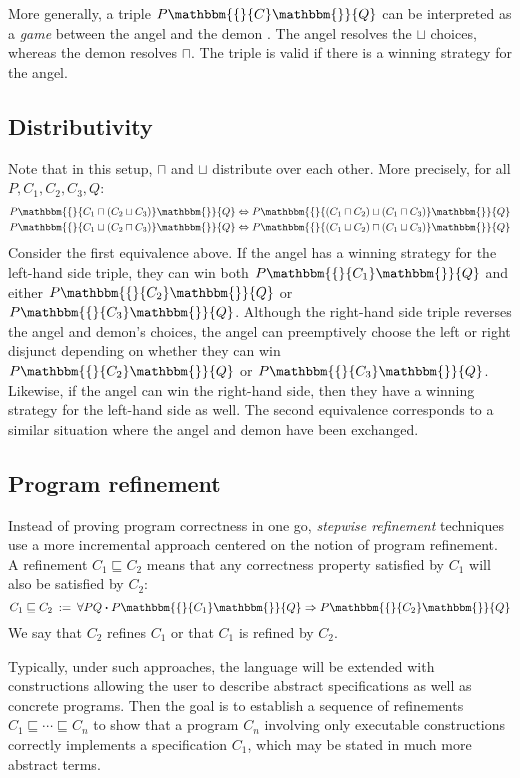 \documentclass[draft,11pt]{report}
\theoremstyle{definition}
\newcommand{\bdot}{\boldsymbol{\cdot}}
\newcommand{\htr}[3]{{ {#1} \mathbbm{\{} {#2} \mathbbm{\}} {#3} }}
\begin{document}
More generally,
a triple $\htr{P}{C}{Q}$
can be interpreted as a \emph{game}
between the angel and the demon \citep{refcal}.
The angel resolves the $\sqcup$ choices,
whereas the demon resolves $\sqcap$.
The triple is valid if there is a winning strategy
for the angel.


\subsection{Distributivity} %

Note that in this setup,
$\sqcap$ and $\sqcup$ distribute over each other.
More precisely, for all $P, C_1, C_2, C_3, Q$:
\begin{align*}
  \htr{P}{C_1 \sqcap (C_2 \sqcup C_3)}{Q} &\Leftrightarrow
    \htr{P}{(C_1 \sqcap C_2) \sqcup (C_1 \sqcap C_3)}{Q} \\
  \htr{P}{C_1 \sqcup (C_2 \sqcap C_3)}{Q} &\Leftrightarrow
    \htr{P}{(C_1 \sqcup C_2) \sqcap (C_1 \sqcup C_3)}{Q}
\end{align*}
Consider the first equivalence above.
If the angel has a winning strategy for
the left-hand side triple,
they can win both $\htr{P}{C_1}{Q}$
and either $\htr{P}{C_2}{Q}$ or $\htr{P}{C_3}{Q}$.
Although the right-hand side triple
reverses the angel and demon's choices,
the angel can preemptively choose the left or right
disjunct depending on whether they can win
$\htr{P}{C_2}{Q}$ or $\htr{P}{C_3}{Q}$.
Likewise, if the angel can win the right-hand side,
then they have a winning strategy for the left-hand side as well.
The second equivalence corresponds to a similar situation
where the angel and demon have been exchanged.


\subsection{Program refinement} %

Instead of proving program correctness in one go,
\emph{stepwise refinement} techniques use a more incremental approach
centered on the notion of program refinement.
A refinement $C_1 \sqsubseteq C_2$
means that any correctness property satisfied by $C_1$
will also be satisfied by $C_2$:
\[
    C_1 \sqsubseteq C_2 \: := \:
    \forall P Q \bdot
      \htr{P}{C_1}{Q} \Rightarrow
      \htr{P}{C_2}{Q}
\]
We say that $C_2$ refines $C_1$
or that $C_1$ is refined by $C_2$.

Typically,
under such approaches,
the language will be extended with constructions
allowing the user to describe
abstract specifications as well as
concrete programs.
Then the goal is to establish
a sequence of refinements
$C_1 \sqsubseteq \cdots \sqsubseteq C_n$
to show that a program $C_n$ involving
only executable constructions
correctly implements a specification $C_1$,
which may be stated in much more abstract terms.
\end{document}
